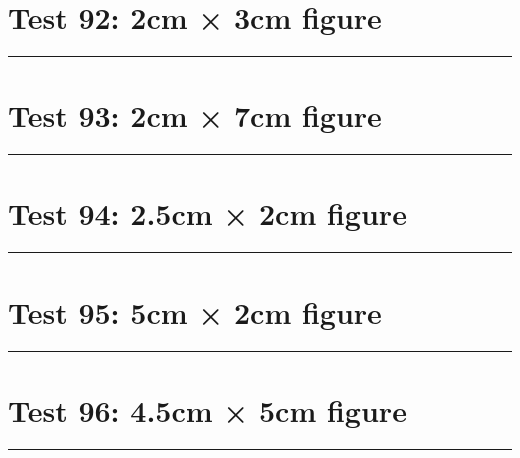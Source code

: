 \documentclass[a4paper,11pt]{article}
\begin{document}
\section*{Test 92: 2cm × 3cm figure}
\begin{swarmwrap}%
  \begin{minipage}[t]{2cm}
    \centering
    \rule{\linewidth}{3cm}
  \end{minipage}%
\end{swarmwrap}%
\swarmwrapnext
\lipsum[141]
\lipsum[142]
\lipsum[143]
\lipsum[144]
\section*{Test 93: 2cm × 7cm figure}
\begin{swarmwrap}%
  \begin{minipage}[t]{2cm}
    \centering
    \rule{\linewidth}{7cm}
  \end{minipage}%
\end{swarmwrap}%
\swarmwrapnext
\lipsum[112]
\lipsum[113]
\lipsum[114]
\lipsum[115]
\section*{Test 94: 2.5cm × 2cm figure}
\begin{swarmwrap}%
  \begin{minipage}[t]{2cm}
    \centering
    \rule{\linewidth}{2cm}
  \end{minipage}%
\end{swarmwrap}%
\swarmwrapnext
\lipsum[95]
\lipsum[96]
\lipsum[97]
\lipsum[98]
\lipsum[99]
\section*{Test 95: 5cm × 2cm figure}
\begin{swarmwrap}%
  \begin{minipage}[t]{5cm}
    \centering
    \rule{\linewidth}{2cm}
  \end{minipage}%
\end{swarmwrap}%
\swarmwrapnext
\lipsum[55]
\lipsum[56]
\lipsum[57]
\lipsum[58]
\lipsum[59]
\section*{Test 96: 4.5cm × 5cm figure}
\begin{swarmwrap}%
  \begin{minipage}[t]{4cm}
    \centering
    \rule{\linewidth}{5cm}
  \end{minipage}%
\end{swarmwrap}%
\swarmwrapnext
\lipsum[92]
\lipsum[93]
\lipsum[94]
\end{document}
